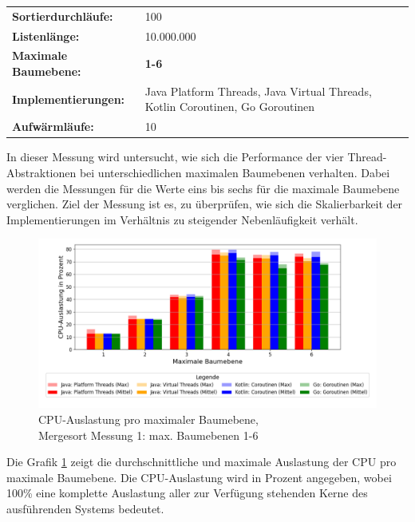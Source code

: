 \documentclass[fontsize=12pt,paper=a4,twoside=semi,parskip=half-,headsepline,headinclude]{scrreprt}
\begin{document}
\begin{tabularx}{\textwidth}{@{}lX@{}}
	\textbf{Sortierdurchläufe:} & 100 \\
	\textbf{Listenlänge:} & 10.000.000 \\
	\textbf{Maximale Baumebene:} & \textbf{1-6} \\
	\textbf{Implementierungen:} & Java Platform Threads, Java Virtual Threads, Kotlin Coroutinen, Go Goroutinen \\
	\textbf{Aufwärmläufe:} & 10
\end{tabularx}

In dieser Messung wird untersucht, wie sich die Performance der vier Thread-Ab\-strak\-tio\-nen bei unterschiedlichen maximalen Baumebenen verhalten. Dabei werden die Messungen für die Werte eins bis sechs für die maximale Baumebene verglichen. Ziel der Messung ist es, zu überprüfen, wie sich die Skalierbarkeit der Implementierungen im Verhältnis zu steigender Nebenläufigkeit verhält.

\begin{figure}[H]
	\centering
	\includegraphics[scale=0.5]{figures/mergesort/Maximalebauebenen1-6/cpu_usage_bar_plot.png}
	\caption{CPU-Auslastung pro maximaler Baumebene,\\ Mergesort Messung 1: max. Baumebenen 1-6}
	\label{fig:ms1-6CPU}
\end{figure}

Die Grafik \ref{fig:ms1-6CPU} zeigt die durchschnittliche und maximale Auslastung der CPU pro maximale Baumebene. Die CPU-Auslastung wird in Prozent angegeben, wobei 100\% eine komplette Auslastung aller zur Verfügung stehenden Kerne des ausführenden Systems bedeutet.
\end{document}
